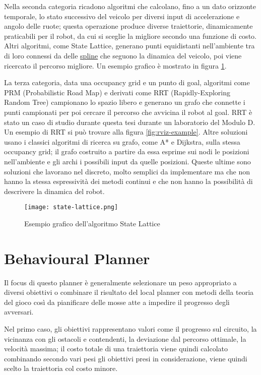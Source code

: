 Nella seconda categoria ricadono algoritmi che calcolano, fino a un dato orizzonte temporale, lo stato
successivo del veicolo per diversi input di accelerazione e angolo delle ruote; questa operazione produce
diverse traiettorie, dinamicamente praticabili per il robot, da cui si sceglie la migliore secondo una
funzione di costo. Altri algoritmi, come State Lattice, generano punti equidistanti nell'ambiente tra di
loro connessi da delle \hyperref[par:spline-def]{spline} che seguono la dinamica del veicolo, poi viene
ricercato il percorso migliore. Un esempio grafico è mostrato in figura \ref{fig:state-lattice}.

La terza categoria, data una occupancy grid e un punto di goal, algoritmi come PRM (Probabilistic Road
Map) e derivati come RRT (Rapidly-Exploring Random Tree) campionano lo spazio libero e generano un grafo
che connette i punti campionati per poi cercare il percorso che avvicina il robot al goal. RRT è stato un
caso di studio durante questa tesi durante un laboratorio del Modulo D. Un esempio di RRT si può trovare
alla figura \ref{fig:rviz-example}. Altre soluzioni usano i classici algoritmi di ricerca su grafo, come
A* e Dijkstra, sulla stessa occupancy grid; il grafo costruito a partire da essa esprime sui nodi le posizioni
nell'ambiente e gli archi i possibili input da quelle posizioni. Queste ultime sono soluzioni che
lavorano nel discreto, molto semplici da implementare ma che non hanno la stessa espressività dei metodi
continui e che non hanno la possibilità di descrivere la dinamica del robot.

\begin{figure}[H]
	\begin{center}
		\texttt{[image: state-lattice.png]}
	\end{center}
	\caption{Esempio grafico dell'algoritmo State Lattice \cite{state-lattice}}
	\label{fig:state-lattice}
\end{figure}

\section{Behavioural Planner}
Il focus di questo planner è generalmente selezionare un peso appropriato a diversi obiettivi o combinare
il risultato del local planner con metodi della teoria del gioco così da pianificare delle mosse atte a
impedire il progresso degli avversari.

Nel primo caso, gli obiettivi rappresentano valori come il progresso sul circuito, la vicinanza con gli
ostacoli e contendenti, la deviazione dal percorso ottimale, la velocità massima; il costo totale di una
traiettoria viene quindi calcolato combinando secondo vari pesi gli obiettivi presi in considerazione,
viene quindi scelto la traiettoria col costo minore.

